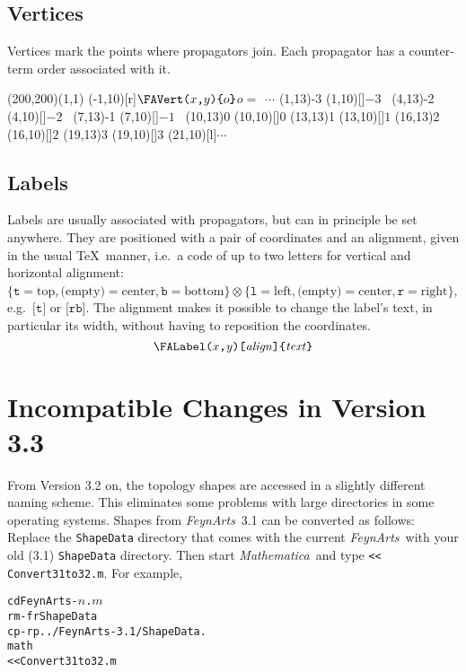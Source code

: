 \documentclass[twoside,12pt]{article}
\def\FA{\textit{FeynArts}}
\def\mma{{\it Mathematica}}
\def\ie{i.e.\ }
\def\eg{e.g.\ }
\def\lbrac{\symbol{123}}
\def\rbrac{\symbol{125}}
\def\Brac#1{\lbrac#1\rbrac}
\def\backsl{\symbol{92}}
\def\Code#1{\ensuremath{\texttt{#1}}}
\def\Var#1{\ensuremath{\mathit{#1}}}
\begin{document}
\begin{appendix}
\subsection{Vertices}

Vertices mark the points where propagators join.  Each propagator has a 
counter-term order associated with it.  
\begin{center}
\vspace*{-10ex}
\hspace*{20ex}\begin{feynartspicture}(200,200)(1,1)
\FADiagram{}
\FALabel(-1,10)[r]{\Code{\backsl FAVert($x$,$y$)\Brac{$o$}}\qquad $o =~~\cdots$}
\FAVert(1,13){-3}
\FALabel(1,10)[]{$-3$~}
\FAVert(4,13){-2}
\FALabel(4,10)[]{$-2$~}
\FAVert(7,13){-1}
\FALabel(7,10)[]{$-1$~}
\FAVert(10,13){0}
\FALabel(10,10)[]{$0$}
\FAVert(13,13){1}
\FALabel(13,10)[]{$1$}
\FAVert(16,13){2}
\FALabel(16,10)[]{$2$}
\FAVert(19,13){3}
\FALabel(19,10)[]{$3$}
\FALabel(21,10)[l]{$\cdots$}
\end{feynartspicture}
\vspace*{-15ex}
\end{center}


\subsection{Labels}

Labels are usually associated with propagators, but can in principle be
set anywhere.  They are positioned with a pair of coordinates and an
alignment, given in the usual \TeX\ manner, \ie a code of up to two
letters for vertical and horizontal alignment: $\{\Code{t} = \text{top},
\text{(empty)} = \text{center}, \Code{b} = \text{bottom}\}\otimes
\{\Code{l} = \text{left}, \text{(empty)} = \text{center}, \Code{r} =
\text{right}\}$, \eg \Code{[t]} or \Code{[rb]}.  The alignment makes it
possible to change the label's text, in particular its width, without
having to reposition the coordinates.
$$
\Code{\backsl FALabel(\Var{x},\Var{y})[\Var{align}]\Brac{\Var{text}}}
$$


\clearpage

\section{Incompatible Changes in Version 3.3}%
%
\index{changes in \FA\ 3.3}

From Version 3.2 on, the topology shapes are accessed in a slightly 
different naming scheme.  This eliminates some problems with large 
directories in some operating systems.  Shapes from \FA\ 3.1 can be 
converted as follows: Replace the \verb=ShapeData= directory that comes 
with the current \FA\ with your old (3.1) \verb=ShapeData= directory. 
Then start \mma\ and type \verb=<< Convert31to32.m=.  For example,
\begin{alltt}
  cd FeynArts-\(n\).\(m\)
  rm -fr ShapeData
  cp -rp ../FeynArts-3.1/ShapeData .
  math
  << Convert31to32.m
\end{alltt}

\end{appendix}
\end{document}
